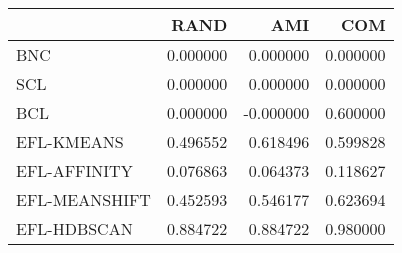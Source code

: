 \begin{tabular}{lrrr}
\toprule
 & RAND & AMI & COM \\
\midrule
BNC & 0.000000 & 0.000000 & 0.000000 \\
SCL & 0.000000 & 0.000000 & 0.000000 \\
BCL & 0.000000 & -0.000000 & 0.600000 \\
EFL-KMEANS & 0.496552 & 0.618496 & 0.599828 \\
EFL-AFFINITY & 0.076863 & 0.064373 & 0.118627 \\
EFL-MEANSHIFT & 0.452593 & 0.546177 & 0.623694 \\
EFL-HDBSCAN & 0.884722 & 0.884722 & 0.980000 \\
\bottomrule
\end{tabular}
